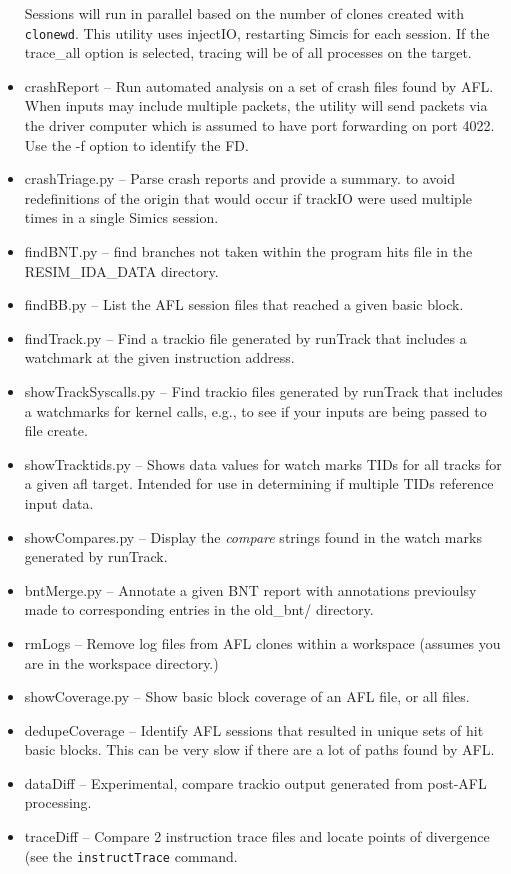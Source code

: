 \documentclass[titlepage]{article}
\begin{document}
\begin{itemize}
Sessions will run in parallel based on the number of clones created with {\tt clonewd}.  This utility uses injectIO, restarting Simcis for each session.  If the trace\_all option
is selected, tracing will be of all processes on the target.
\item crashReport -- Run automated analysis on a set of crash files found by AFL.  When inputs may include multiple packets, the utility
will send packets via the driver computer which is assumed to have port forwarding on port 4022.   Use the -f option
to identify the FD.
\item crashTriage.py -- Parse crash reports and provide a summary.
to avoid redefinitions of the origin that would occur if trackIO were used multiple times in a single Simics session.
\item findBNT.py -- find branches not taken within the program hits file in the RESIM\_IDA\_DATA directory.
\item findBB.py -- List the AFL session files that reached a given basic block.
\item findTrack.py -- Find a trackio file generated by runTrack that includes a watchmark at the given instruction address.
\item showTrackSyscalls.py -- Find trackio files generated by runTrack that includes a watchmarks for kernel calls, e.g., to see if your inputs are being passed to file create.
\item showTracktids.py -- Shows data values for watch marks TIDs for all tracks for a given afl target.
Intended for use in determining if multiple TIDs reference input data.
\item showCompares.py -- Display the \textit{compare} strings found in the watch marks generated by runTrack.
\item bntMerge.py -- Annotate a given BNT report with annotations previoulsy made to corresponding entries in the old\_bnt/ directory.
\item rmLogs -- Remove log files from AFL clones within a workspace (assumes you are in the workspace directory.)
\item showCoverage.py -- Show basic block coverage of an AFL file, or all files.
\item dedupeCoverage -- Identify AFL sessions that resulted in unique sets of hit basic blocks. This can be very slow if there are a lot of paths found by AFL.
\item dataDiff -- Experimental, compare trackio output generated from post-AFL processing.
\item traceDiff -- Compare 2 instruction trace files and locate points of divergence (see the {\tt instructTrace} command.

\end{itemize}
\end{document}
